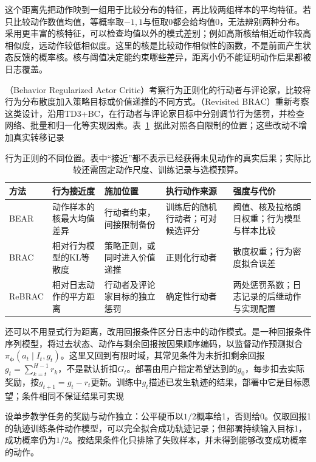 这个距离先把动作映到一组用于比较分布的特征，再比较两组样本的平均特征。若只比较动作数值均值，等概率取$-1,1$与恒取0都会给均值0，无法辨别两种分布。采用更丰富的核特征，可以检查均值以外的模式差别；例如高斯核给相近动作较高相似度，远动作较低相似度。这里的核是比较动作相似性的函数，不是前面产生状态反馈的概率核。核与阈值决定能约束哪些差异，距离小仍不能证明动作后果都被日志覆盖。

（Behavior Regularized Actor Critic）考察行为正则化的行动者与评论家，比较将行为分布散度加入策略目标或价值递推的不同方式。（Revisited BRAC）重新考察这类设计，沿用TD3+BC，在行动者与评论家目标中分别调节行为惩罚，并检查网络、批量和归一化等实现因素。表~\ref{tab:rl-information-behavior-methods}~据此对照各自限制的位置；这些改动不增加真实转移记录

\begin{table}[t]
  \centering
  \small
  \begin{tabularx}{\linewidth}{p{15mm}XXXX}
    \toprule
    方法 & 行为接近度 & 施加位置 & 执行动作来源 & 强度与代价 \\
    \midrule
    BEAR & 动作样本的核最大均值差异 & 行动者约束，间接限制备份 & 训练后的随机行动者；可对候选评分 & 阈值、核及拉格朗日权重；行为模型与样本比较 \\
    BRAC & 相对行为模型的KL等散度 & 策略正则，或同时进入价值递推 & 正则化行动者 & 散度权重；行为密度拟合误差 \\
    ReBRAC & 相对日志动作的平方距离 & 行动者及评论家目标的独立惩罚 & 确定性行动者 & 两处惩罚系数；日志记录的后继动作与实现配置 \\
    \bottomrule
  \end{tabularx}
  \caption{行为正则的不同位置。表中“接近”都不表示已经获得未见动作的真实后果；实际比较还需固定动作尺度、训练记录与选模预算。}
  \label{tab:rl-information-behavior-methods}
\end{table}

还可以不用显式行为距离，改用回报条件区分日志中的动作模式。是一种回报条件序列模型，将过去状态、动作与剩余回报按因果顺序编码，以监督动作预测拟合$\pi_{\bm\phi}(a_t\mid I_t,g_t)$。这里又回到有限时域，其常见条件为未折扣剩余回报$g_t=\sum_{k=t}^{H-1}r_k$，不是默认折扣$G_t$。部署由用户指定希望达到的$g_0$，每步扣去实际奖励，按$g_{t+1}=g_t-r_t$更新。训练中$g_t$描述已发生轨迹的结果，部署中它是目标愿望；条件相同不保证结果可实现

\begin{example}[回报条件不能控制外部随机结果]
  \label{ex:rl-information-return-conditioning}
  设单步教学任务的奖励与动作独立：公平硬币以$1/2$概率给1，否则给0。仅取回报1的轨迹训练条件动作模型，可以完全拟合成功轨迹记录；但部署持续输入目标1，成功概率仍为$1/2$。按结果条件化只排除了失败样本，并未得到能够改变成功概率的动作。
\end{example}

